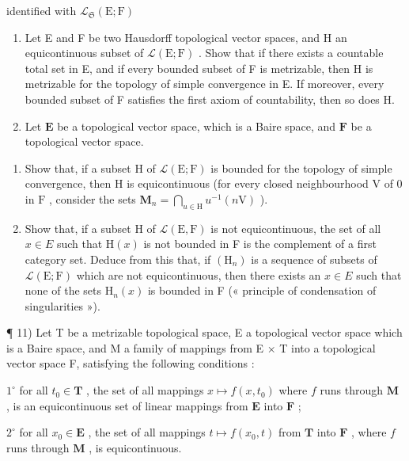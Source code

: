 identified with \(\mathcal{L}_{\mathfrak{S}}(\mathrm{E};\mathrm{F})\)

\begin{enumerate}
\def\labelenumi{\arabic{enumi})}
\setcounter{enumi}{8}
\item
  Let E and F be two Hausdorff topological vector spaces, and H an equicontinuous subset of \(\mathcal{L}(\mathrm{E};\mathrm{F})\) . Show that if there exists a countable total set in E, and if every bounded subset of F is metrizable, then H is metrizable for the topology of simple convergence in E. If moreover, every bounded subset of F satisfies the first axiom of countability, then so does H.
\item
  Let \(\mathbf{E}\) be a topological vector space, which is a Baire space, and \(\mathbf{F}\) be a topological vector space.
\end{enumerate}

\begin{enumerate}
\def\labelenumi{\alph{enumi})}
\item
  Show that, if a subset \(\mathrm{H}\) of \(\mathcal{L}(\mathrm{E};\mathrm{F})\) is bounded for the topology of simple convergence, then \(\mathrm{H}\) is equicontinuous (for every closed neighbourhood \(\mathrm{V}\) of 0 in \(\mathrm{F}\) , consider the sets \(\mathbf{M}_n = \bigcap_{u\in \mathrm{H}}u^{-1}(n\mathrm{V})\) ).
\item
  Show that, if a subset H of \(\mathcal{L}(\mathrm{E},\mathrm{F})\) is not equicontinuous, the set of all \(x\in E\) such that \(\mathrm{H}(x)\) is not bounded in F is the complement of a first category set. Deduce from this that, if \((\mathrm{H}_{n})\) is a sequence of subsets of \(\mathcal{L}(\mathrm{E};\mathrm{F})\) which are not equicontinuous, then there exists an \(x\in E\) such that none of the sets \(\mathrm{H}_{n}(x)\) is bounded in F (« principle of condensation of singularities »).
\end{enumerate}

¶ 11) Let T be a metrizable topological space, E a topological vector space which is a Baire space, and M a family of mappings from E × T into a topological vector space F, satisfying the following conditions :

\(1^{\circ}\) for all \(t_0 \in \mathbf{T}\) , the set of all mappings \(x \mapsto f(x, t_0)\) where \(f\) runs through \(\mathbf{M}\) , is an equicontinuous set of linear mappings from \(\mathbf{E}\) into \(\mathbf{F}\) ;

\(2^{\circ}\) for all \(x_0 \in \mathbf{E}\) , the set of all mappings \(t \mapsto f(x_0, t)\) from \(\mathbf{T}\) into \(\mathbf{F}\) , where \(f\) runs through \(\mathbf{M}\) , is equicontinuous.

